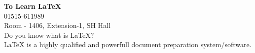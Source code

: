 \documentclass{article}
\begin{document}
\vspace*{\fill}
\begin{center}
 \LARGE{\textbf{To Learn \LaTeX{}}}
\\
\vspace{2cm}
 \faPhone{} 01515-611989\\
  \faHome{} Room - 1406, Extension-1, SH Hall
\\
\vspace{2cm}
Do you know what is \LaTeX{}?\\
\LaTeX{} is a highly qualified and powerfull document preparation system/software.
\end{center}
\vspace*{\fill}
 
\end{document}
